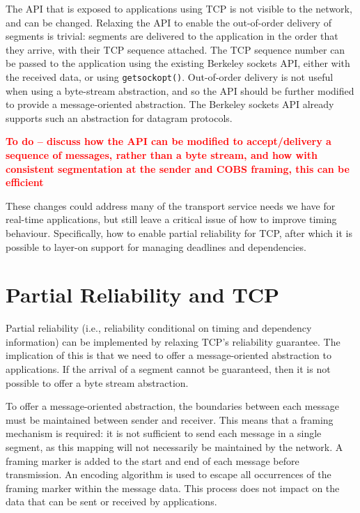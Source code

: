 \documentclass{sig-alternate-05-2015}
\newcommand{\todo}[1]{\textbf{\textcolor{red}{To do -- #1}}}
\begin{document}
The API that is exposed to applications using TCP is not visible to the
network, and can be changed. Relaxing the API to enable the out-of-order
delivery of segments is trivial: segments are delivered to the application
in the order that they arrive, with their TCP sequence attached. The TCP
sequence number can be passed to the application using the existing
Berkeley sockets API, either with the received data, or using 
\texttt{getsockopt()}. Out-of-order delivery is not useful when using a 
byte-stream abstraction, and so the API should be further modified to
provide a message-oriented abstraction. The Berkeley sockets API already
supports such an abstraction for datagram protocols.

\todo{discuss how the API can be modified to accept/delivery a sequence
      of messages, rather than a byte stream, and how with consistent
      segmentation at the sender and COBS framing, this can be efficient}

These changes could address many of the transport service needs we have for
real-time applications, but still leave a critical issue of how to improve
timing behaviour. Specifically, how to enable partial reliability for TCP,
after which it is possible to layer-on support for managing deadlines and 
dependencies.

\section{Partial Reliability and TCP}
\label{sec:partial}

Partial reliability (i.e., reliability conditional on timing and dependency
information) can be implemented by relaxing TCP's reliability guarantee.
The implication of this is that we need to offer a message-oriented
abstraction to applications. If the arrival of a segment cannot be
guaranteed, then it is not possible to offer a byte stream abstraction.

To offer a message-oriented abstraction, the boundaries between each
message must be maintained between sender and receiver. This means that a
framing mechanism is required: it is not sufficient to send each message in
a single segment, as this mapping will not necessarily be maintained by the
network. A framing marker is added to the start and end of each message
before transmission. An encoding algorithm is used to escape all occurrences
of the framing marker within the message data. This process does not impact
on the data that can be sent or received by applications.
\end{document}
